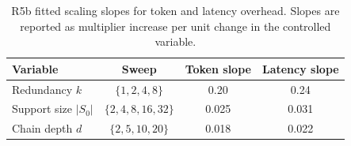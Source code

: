 \begin{table}[!ht]
\centering
\caption{\small R5b fitted scaling slopes for token and latency overhead. Slopes are reported as multiplier increase per unit change in the controlled variable.}
\label{tab:r5_scaling}
\scriptsize
\begin{tabular}{lccc}
\toprule
Variable & Sweep & Token slope & Latency slope \\
\midrule
Redundancy \(k\) & \(\{1,2,4,8\}\) & 0.20 & 0.24 \\
Support size \(|S_0|\) & \(\{2,4,8,16,32\}\) & 0.025 & 0.031 \\
Chain depth \(d\) & \(\{2,5,10,20\}\) & 0.018 & 0.022 \\
\bottomrule
\end{tabular}
\end{table}

